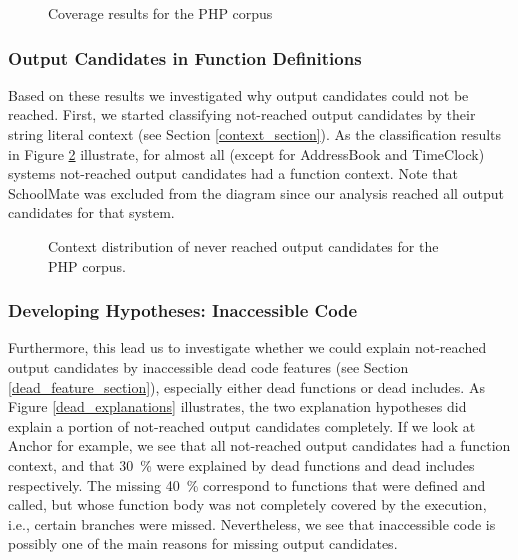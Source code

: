 \documentclass[preprint]{sig-alternate-05-2015}
\begin{document}
\begin{figure}
	\centering	
	\resizebox{0.4\textwidth}{!}{%
			
	}
	\caption{Coverage results for the PHP corpus}
	\label{coverage}
\end{figure}

\subsubsection{Output Candidates in Function Definitions}
Based on these results we investigated why output candidates could not be reached. First, we started classifying not-reached output candidates by their string literal context (see Section \ref{context_section}). As the classification results in Figure \ref{contexts} illustrate, for almost all (except for AddressBook and TimeClock) systems not-reached output candidates had a function context. Note that SchoolMate was excluded from the diagram since our analysis reached all output candidates for that system.

\begin{figure}
	\resizebox{0.4\textwidth}{!}{%
		
	}	
	\caption{Context distribution of never reached output candidates for the PHP
	corpus.}
	\label{contexts}
\end{figure}

\subsubsection{Developing Hypotheses: Inaccessible Code}
Furthermore, this lead us to investigate whether we could explain not-reached output candidates by inaccessible dead code features (see Section \ref{dead_feature_section}), especially either dead functions or dead includes. As Figure \ref{dead_explanations} illustrates, the two explanation hypotheses did explain a portion of not-reached output candidates completely. If we look at Anchor for example, we see that all not-reached output candidates had a function context, and that 30~\% were explained by dead functions and dead includes respectively. The missing 40~\% correspond to functions that were defined and called, but whose function body was not completely covered by the execution, i.e., certain branches were missed.
Nevertheless, we see that inaccessible code is possibly one of the main reasons for missing output candidates. 
\end{document}
